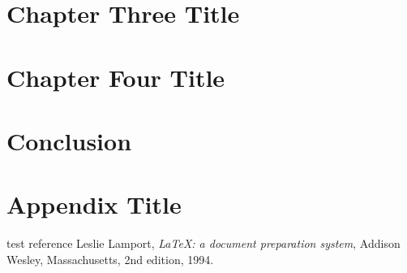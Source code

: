 \documentclass[12pt]{report}
\begin{document}
\chapter{Chapter Three Title}
%

\chapter{Chapter Four Title}
%

\chapter{Conclusion}
%

\appendix
\chapter{Appendix Title}
%



\begin{thebibliography}{99}
 test reference
  Leslie Lamport,
  \textit{\LaTeX: a document preparation system},
  Addison Wesley, Massachusetts,
  2nd edition,
  1994.
\end{thebibliography}
\end{document}
